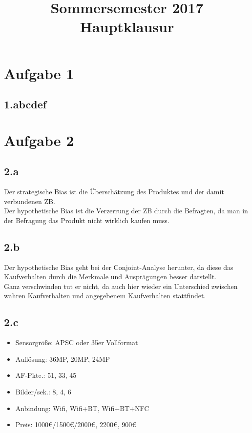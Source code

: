 

\title{Sommersemester 2017 Hauptklausur}
\maketitle



\section{Aufgabe 1}
\subsection{1.abcdef}



\section{Aufgabe 2}
\subsection{2.a}
    Der strategische Bias ist die Überschätzung des Produktes und der damit verbundenen ZB. \\
    Der hypothetische Bias ist die Verzerrung der ZB durch die Befragten, da man in der Befragung das Produkt nicht wirklich kaufen muss.

\subsection{2.b}
    Der hypothetische Bias geht bei der Conjoint-Analyse herunter, da diese das Kaufverhalten durch die Merkmale und Ausprägungen besser darstellt. \\
    Ganz verschwinden tut er nicht, da auch hier wieder ein Unterschied zwischen wahren Kaufverhalten und angegebenem Kaufverhalten stattfindet.

\subsection{2.c}
    \begin{itemize}
        \item Sensorgröße: APSC oder 35er Vollformat
        \item Auflösung: 36MP, 20MP, 24MP
        \item AF-Pkte.: 51, 33, 45
        \item Bilder/sek.: 8, 4, 6
        \item Anbindung: Wifi, Wifi+BT, Wifi+BT+NFC
        \item Preis: 1000€/1500€/2000€, 2200€, 900€
    \end{itemize}

